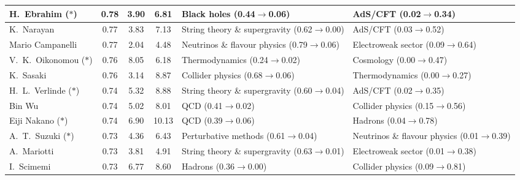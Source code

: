 \begin{table}[H]
\begin{tabular}{p{}|c|c|c|b{}|b{}}
     H.~Ebrahim ($\ast$) &  0.78 &          3.90 &          6.81 &                   Black holes (0.44$\to$0.06) &                      AdS/CFT (0.02$\to$0.34)\\ \hline
              K.~Narayan &  0.77 &          3.83 &          7.13 & String theory \& supergravity (0.62$\to$0.00) &                      AdS/CFT (0.03$\to$0.52)\\ \hline
        Mario Campanelli &  0.77 &          2.04 &          4.48 &  Neutrinos \& flavour physics (0.79$\to$0.06) &           Electroweak sector (0.09$\to$0.64)\\ \hline
V.~K.~Oikonomou ($\ast$) &  0.76 &          8.05 &          6.18 &                Thermodynamics (0.24$\to$0.02) &                    Cosmology (0.00$\to$0.47)\\ \hline
               K.~Sasaki &  0.76 &          3.14 &          8.87 &              Collider physics (0.68$\to$0.06) &               Thermodynamics (0.00$\to$0.27)\\ \hline
 H.~L.~Verlinde ($\ast$) &  0.74 &          5.32 &          8.88 & String theory \& supergravity (0.60$\to$0.04) &                      AdS/CFT (0.02$\to$0.35)\\ \hline
                  Bin Wu &  0.74 &          5.02 &          8.01 &                           QCD (0.41$\to$0.02) &             Collider physics (0.15$\to$0.56)\\ \hline
    Eiji Nakano ($\ast$) &  0.74 &          6.90 &         10.13 &                           QCD (0.39$\to$0.06) &                      Hadrons (0.04$\to$0.78)\\ \hline
   A.~T.~Suzuki ($\ast$) &  0.73 &          4.36 &          6.43 &          Perturbative methods (0.61$\to$0.04) & Neutrinos \& flavour physics (0.01$\to$0.39)\\ \hline
             A.~Mariotti &  0.73 &          3.81 &          4.91 & String theory \& supergravity (0.63$\to$0.01) &           Electroweak sector (0.01$\to$0.38)\\ \hline
              I.~Scimemi &  0.73 &          6.77 &          8.60 &                       Hadrons (0.36$\to$0.00) &             Collider physics (0.09$\to$0.81)\\ \hline
\bottomrule
\end{tabular}\normalsize\renewcommand{\arraystretch}{1}
\end{table}
